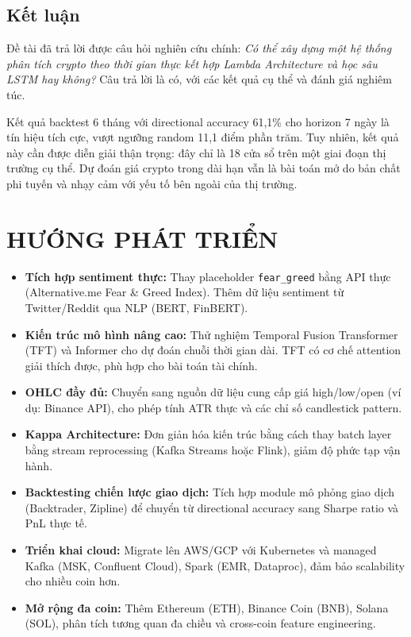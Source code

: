 \documentclass[12pt, a4paper]{report}
\begin{document}
\section{Kết luận}

Đề tài đã trả lời được câu hỏi nghiên cứu chính: \textit{Có thể xây dựng một hệ thống
phân tích crypto theo thời gian thực kết hợp Lambda Architecture và học sâu LSTM hay không?}
Câu trả lời là có, với các kết quả cụ thể và đánh giá nghiêm túc.

Kết quả backtest 6 tháng với directional accuracy 61,1\% cho horizon 7 ngày là tín hiệu
tích cực, vượt ngưỡng random 11,1 điểm phần trăm. Tuy nhiên, kết quả này cần được diễn
giải thận trọng: đây chỉ là 18 cửa sổ trên một giai đoạn thị trường cụ thể. Dự đoán
giá crypto trong dài hạn vẫn là bài toán mở do bản chất phi tuyến và nhạy cảm với yếu
tố bên ngoài của thị trường.

\chapter{HƯỚNG PHÁT TRIỂN}

\begin{itemize}
  \item \textbf{Tích hợp sentiment thực:} Thay placeholder \texttt{fear\_greed} bằng
    API thực (Alternative.me Fear \& Greed Index). Thêm dữ liệu sentiment từ Twitter/Reddit
    qua NLP (BERT, FinBERT).

  \item \textbf{Kiến trúc mô hình nâng cao:} Thử nghiệm Temporal Fusion Transformer (TFT)
    \cite{ref5} và Informer cho dự đoán chuỗi thời gian dài. TFT có cơ chế attention
    giải thích được, phù hợp cho bài toán tài chính.

  \item \textbf{OHLC đầy đủ:} Chuyển sang nguồn dữ liệu cung cấp giá high/low/open (ví dụ:
    Binance API), cho phép tính ATR thực và các chỉ số candlestick pattern.

  \item \textbf{Kappa Architecture:} Đơn giản hóa kiến trúc bằng cách thay batch layer bằng
    stream reprocessing (Kafka Streams hoặc Flink), giảm độ phức tạp vận hành.

  \item \textbf{Backtesting chiến lược giao dịch:} Tích hợp module mô phỏng giao dịch
    (Backtrader, Zipline) để chuyển từ directional accuracy sang Sharpe ratio và PnL
    thực tế.

  \item \textbf{Triển khai cloud:} Migrate lên AWS/GCP với Kubernetes và managed Kafka (MSK,
    Confluent Cloud), Spark (EMR, Dataproc), đảm bảo scalability cho nhiều coin hơn.

  \item \textbf{Mở rộng đa coin:} Thêm Ethereum (ETH), Binance Coin (BNB), Solana (SOL),
    phân tích tương quan đa chiều và cross-coin feature engineering.
\end{itemize}



\end{document}
